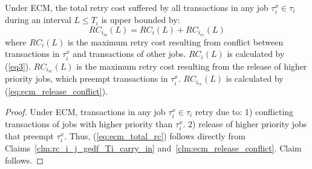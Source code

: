 %
\begin{clm}\label{clm:ecm_total_rc}
Under ECM, the total retry cost suffered by all transactions in any job $\tau_i^x \in \tau_i$ during an interval $L\le T_i$ is upper bounded by:
\begin{equation}
RC_{i_{to}}(L)=RC_i(L)+RC_{i_{re}}(L)
\label{eq:ecm_total_rc}
\end{equation}
where $RC_i(L)$ is the maximum retry cost resulting from conflict between transactions in $\tau_i^x$ and transactions of other jobs. $RC_i(L)$ is calculated by (\ref{eq3}). $RC_{i_{re}}(L)$ is the maximum retry cost resulting from the release of higher priority jobs, which preempt transactions in $\tau_i^x$. $RC_{i_{re}}(L)$ is calculated by (\ref{eq:ecm_release_conflict}).
%
\end{clm}
\begin{proof}\normalfont
%
Under ECM, transactions in any job $\tau_i^x \in \tau_i$ retry due to: 1) conflicting transactions of jobs with higher priority than $\tau_i^x$. 2) release of higher priority jobs that preempt $\tau_i^x$. Thus, (\ref{eq:ecm_total_rc}) follows directly from Claims~\ref{clm:rc_i_j_gedf_Ti_carry_in} and~\ref{clm:ecm_release_conflict}. Claim follows.
%
\end{proof}
%
